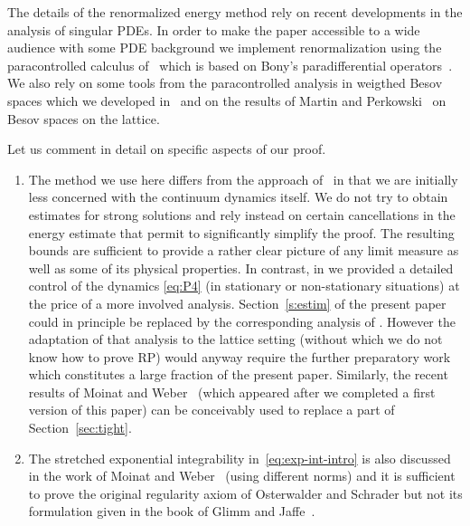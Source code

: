 \documentclass[a4paper,11pt]{article}
\numberwithin{equation}{section}
\begin{document}
The details of the renormalized energy method rely on recent developments in
the analysis of singular PDEs. In order to make the paper accessible to a wide audience with some PDE background 
 we  implement
 renormalization using the paracontrolled calculus of~{\cite{GIP}} which is based on Bony's paradifferential operators~\cite{bony_calcul_1981, meyer_remarques_1981, BCD}.
 We  also rely on some tools from the paracontrolled analysis in weigthed Besov spaces which we developed in~{\cite{GH18}} and on the results of Martin and Perkowski~{\cite{MP17}} on Besov spaces on the lattice.

%


\begin{remark} Let us comment in detail on  specific aspects of our proof.
  \begin{enumerate}
  
   \item The method we use here  differs from the approach
of~{\cite{GH18}} in that we are initially less concerned with the continuum
dynamics itself. We do not try to obtain estimates for strong solutions and
rely instead on certain cancellations in the energy estimate that permit to
significantly simplify the proof. The resulting bounds are sufficient to
provide a rather clear picture of any limit measure as well as some of its physical
properties. In contrast, in {\cite{GH18}} we provided a
detailed control of the dynamics {\eqref{eq:P4}} (in stationary or
non-stationary situations) at the price of a more involved analysis.
Section~\ref{s:estim} of the present paper could in principle be replaced by
the corresponding analysis of {\cite{GH18}}. However the adaptation of that
analysis to the lattice setting (without which we do not know how to prove RP) would anyway require the further preparatory work which constitutes a large fraction of the present paper. Similarly, the recent results of Moinat and Weber~{\cite{moinat_space_time_2018}} (which appeared after we completed a first version of this paper) can be conceivably used to replace a part of Section~\ref{sec:tight}. 
  
  
    \item The stretched exponential integrability
    in~{\eqref{eq:exp-int-intro}} is also discussed in the work of Moinat and
    Weber~{\cite{moinat_space_time_2018}} (using different norms) and it is
    sufficient to prove the original regularity axiom of Osterwalder and Schrader but not its formulation given in the book of Glimm and Jaffe~\cite{MR887102}.
    

\end{enumerate}
\end{remark}
\end{document}
